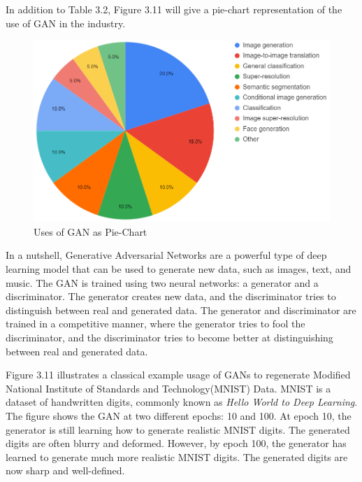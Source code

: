 \noindent
In addition to Table 3.2, Figure 3.11 will give a pie-chart representation of the use of GAN in the industry.\\

\begin{figure}[h!]
    \centering
    \includegraphics[width=\textwidth]{Images/gan_use.png}
    \caption{Uses of GAN as Pie-Chart}
\end{figure}

\clearpage

\noindent
In a nutshell, Generative Adversarial Networks are a powerful type of deep learning model that can be used to generate new data, such as images, text, and music\cite{DCGAN}\cite{CORRGAN}\cite{MuseGAN}. The GAN is trained using two neural networks: a generator and a discriminator. The generator creates new data, and the discriminator tries to distinguish between real and generated data.\cite{Nips_GAN} The generator and discriminator are trained in a competitive manner, where the generator tries to fool the discriminator, and the discriminator tries to become better at distinguishing between real and generated data.\cite{GAN_Main}

\noindent
Figure 3.11 illustrates a classical example usage of GANs to regenerate Modified National Institute of Standards and Technology(MNIST) Data. MNIST is a dataset of handwritten digits, commonly known as \textit{Hello World to Deep Learning}. The figure shows the GAN at two different epochs: 10 and 100. At epoch 10, the generator is still learning how to generate realistic MNIST digits. The generated digits are often blurry and deformed. However, by epoch 100, the generator has learned to generate much more realistic MNIST digits. The generated digits are now sharp and well-defined.\\


